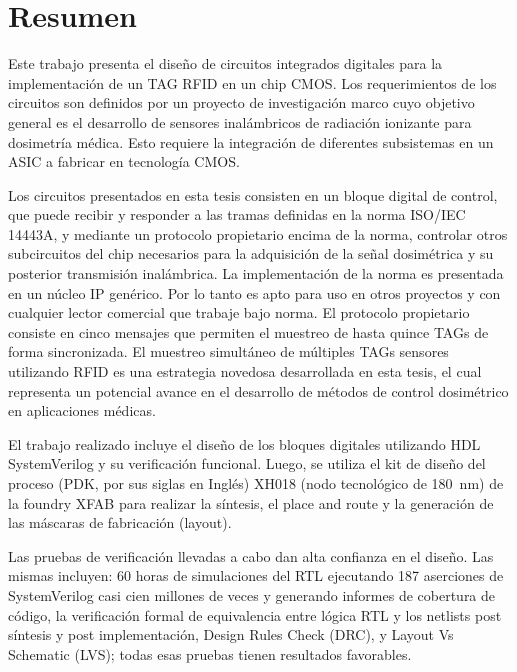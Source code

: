 \documentclass[a4paper, twoside, 11pt]{report}
\begin{document}

\FloatBarrier
\chapter*{Resumen}
Este trabajo presenta el diseño de circuitos integrados digitales para la implementación de un TAG RFID en un chip CMOS. Los requerimientos de los circuitos son definidos por un proyecto de investigación marco cuyo objetivo general es el desarrollo de sensores inalámbricos de radiación ionizante para dosimetría médica. Esto requiere la integración de diferentes subsistemas en un ASIC a fabricar en tecnología CMOS.

Los circuitos presentados en esta tesis consisten en un bloque digital de control, que puede recibir y responder a las tramas definidas en la norma ISO/IEC 14443A, y mediante un protocolo propietario encima de la norma, controlar otros subcircuitos del chip necesarios para la adquisición de la señal dosimétrica y su posterior transmisión inalámbrica. La implementación de la norma es presentada en un núcleo IP genérico. Por lo tanto es apto para uso en otros proyectos y con cualquier lector comercial que trabaje bajo norma. El protocolo propietario consiste en cinco mensajes que permiten el muestreo de hasta quince TAGs de forma sincronizada. El muestreo simultáneo de múltiples TAGs sensores utilizando RFID es una estrategia novedosa desarrollada en esta tesis, el cual representa un potencial avance en el desarrollo de métodos de control dosimétrico en aplicaciones médicas.

El trabajo realizado incluye el diseño de los bloques digitales utilizando HDL SystemVerilog y su verificación funcional. Luego, se utiliza el kit de diseño del proceso (PDK, por sus siglas en Inglés) XH018 (nodo tecnológico de \SI{180}{\nano\meter}) de la foundry XFAB para realizar la síntesis, el place and route y la generación de las máscaras de fabricación (layout).

Las pruebas de verificación llevadas a cabo dan alta confianza en el diseño. Las mismas incluyen: 60 horas de simulaciones del RTL ejecutando 187 aserciones de SystemVerilog casi cien millones de veces y generando informes de cobertura de código, la verificación formal de equivalencia entre lógica RTL y los netlists post síntesis y post implementación, Design Rules Check (DRC), y Layout Vs Schematic (LVS); todas esas pruebas tienen resultados favorables.
\end{document}
